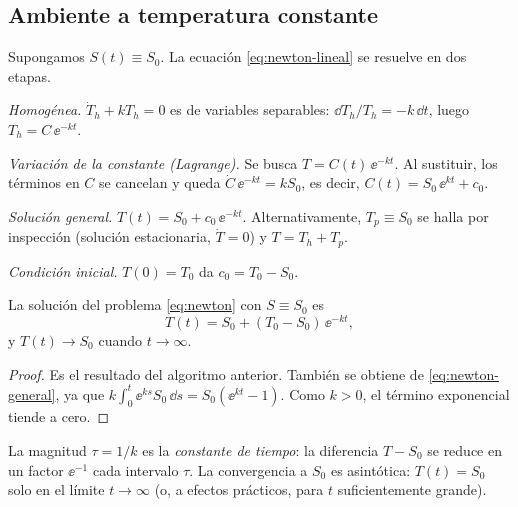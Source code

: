 \subsection*{Ambiente a temperatura constante}

Supongamos $S(t)\equiv S_0$. La ecuación \eqref{eq:newton-lineal} se resuelve en dos etapas.

\begin{algoritmo}[ecuación lineal $\dot y + a\,y = b(t)$]
\begin{pasos}
  \item \emph{Homogénea.} $\dot T_h + kT_h=0$ es de variables separables: $\dd T_h/T_h=-k\,\dd t$, luego $T_h = C\,\ee^{-kt}$.
  \item \emph{Variación de la constante (Lagrange).} Se busca $T = C(t)\,\ee^{-kt}$. Al sustituir, los términos en $C$ se cancelan y queda $\dot C\,\ee^{-kt}=kS_0$, es decir, $C(t)=S_0\,\ee^{kt}+c_0$.
  \item \emph{Solución general.} $T(t)=S_0 + c_0\,\ee^{-kt}$. Alternativamente, $T_p\equiv S_0$ se halla por inspección (solución estacionaria, $\dot T=0$) y $T=T_h+T_p$.
  \item \emph{Condición inicial.} $T(0)=T_0$ da $c_0=T_0-S_0$.
\end{pasos}
\end{algoritmo}

\begin{proposition}\label{prop:newton}
La solución del problema \eqref{eq:newton} con $S\equiv S_0$ es
\begin{equation}
  T(t) = S_0 + (T_0 - S_0)\,\ee^{-kt},
  \label{eq:newton-sol}
\end{equation}
y $T(t)\to S_0$ cuando $t\to\infty$.
\end{proposition}

\begin{proof}
Es el resultado del algoritmo anterior. También se obtiene de \eqref{eq:newton-general}, ya que $k\int_0^t \ee^{ks}S_0\,\dd s=S_0(\ee^{kt}-1)$. Como $k>0$, el término exponencial tiende a cero.
\end{proof}

\begin{remark}
La magnitud $\tau=1/k$ es la \emph{constante de tiempo}: la diferencia $T-S_0$ se reduce en un factor $\ee^{-1}$ cada intervalo $\tau$. La convergencia a $S_0$ es asintótica: $T(t)=S_0$ solo en el límite $t\to\infty$ (o, a efectos prácticos, para $t$ suficientemente grande).
\end{remark}

